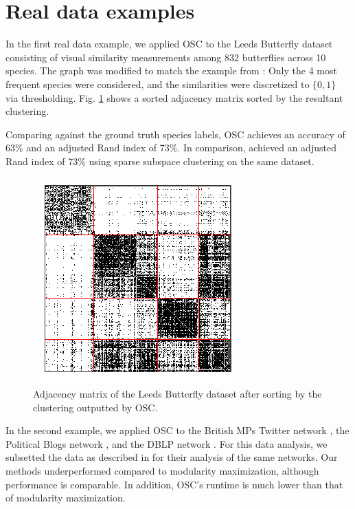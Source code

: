 \documentclass[12pt]{article}
\begin{document}
\hypertarget{real-data-examples}{%
\section{Real data examples}\label{real-data-examples}}

In the first real data example, we applied OSC to the Leeds Butterfly
dataset \cite{Wang_2018} consisting of visual similarity measurements
among 832 butterflies across 10 species. The graph was modified to match
the example from \cite{noroozi2019estimation}: Only the 4 most
frequent species were considered, and the similarities were discretized
to \(\{0, 1\}\) via thresholding. Fig. \ref{fig:butterfly} shows a
sorted adjacency matrix sorted by the resultant clustering.

Comparing against the ground truth species labels, OSC achieves an
accuracy of 63\% and an adjusted Rand index of 73\%. In comparison,
\citet{noroozi2019estimation} achieved an adjusted Rand index of
73\% using sparse subspace clustering on the same dataset.

\begin{figure}[H]

{\centering \includegraphics{summary_files/figure-latex/butterfly-1}

}

\caption{Adjacency matrix of the Leeds Butterfly dataset after sorting by the clustering outputted by OSC.}\label{fig:butterfly}
\end{figure}

In the second example, we applied OSC to the British MPs Twitter network
\cite{greene2013producing}, the Political Blogs network
\cite{10.1145/1134271.1134277}, and the DBLP network
\cite{NIPS2009_3855, 10.1007/978-3-642-15880-3_42}. For this data
analysis, we subsetted the data as described in
\cite{307cbeb9b1be48299388437423d94bf1} for their analysis of the
same networks. Our methods underperformed compared to modularity
maximization, although performance is comparable. In addition, OSC's
runtime is much lower than that of modularity maximization.
\end{document}
